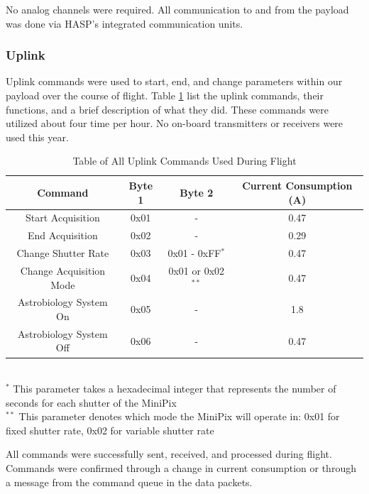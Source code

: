 No analog channels were required. All communication to and from the payload was done via HASP's integrated communication 
units.

\subsubsection{Uplink}
\label{sec:Uplink} 
Uplink commands were used to start, end, and change parameters within our payload over the course of flight. 
Table \ref{tab:All-Commands} list the uplink commands, their functions, and a brief description of what they did. 
These commands were utilized about four time per hour. No on-board transmitters or receivers were used this year.

\begin{table}[H]
\centering
\caption{Table of All Uplink Commands Used During Flight}
\label{tab:All-Commands}
\bigskip
\begin{tabular}{c|c|c|c}
\hline
\hline
\multicolumn{1}{c|}{\bfseries Command} & \multicolumn{1}{c|}{\bfseries Byte 1} &  \multicolumn{1}{c|}{\bfseries Byte 2} & \multicolumn{1}{c}{\bfseries Current Consumption (A)} \\
\hline
	Start Acquisition  		& 0x01	& -	 					& 0.47    \\ \hline
	End Acquisition 		& 0x02	& -	 					& 0.29    \\ \hline
	Change Shutter Rate 	& 0x03 	& 0x01 - 0xFF$^*$		& 0.47 		\\ \hline
	Change Acquisition Mode	& 0x04	& 0x01 or 0x02$^{**}$	& 0.47		\\ \hline
	Astrobiology System On	& 0x05	& -						& 1.8			\\ \hline
	Astrobiology System Off	& 0x06	& -						& 0.47		\\ \hline
\end{tabular}
\\
\footnotesize
$^{*}$ 	This parameter takes a hexadecimal integer that represents the number of seconds for each shutter of the MiniPix \\
$^{**}$	This parameter denotes which mode the MiniPix will operate in: 0x01 for fixed shutter rate, 0x02 for variable shutter rate
\end{table}

All commands were successfully sent, received, and processed during flight. Commands were confirmed through  
a change in current consumption or through a message from the command queue in the data packets. 